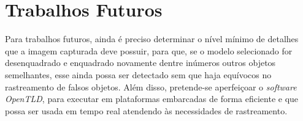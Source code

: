 \chapter[Trabalhos Futuros]{Trabalhos Futuros}
	Para trabalhos futuros, ainda é preciso determinar o nível mínimo de detalhes que a imagem capturada deve possuir, para que, se o modelo selecionado for desenquadrado e enquadrado novamente dentre inúmeros outros objetos semelhantes, esse ainda possa ser detectado sem que haja equívocos no rastreamento de falsos objetos. Além disso, pretende-se aperfeiçoar o \textit{software} \textit{OpenTLD}, para executar em plataformas embarcadas de forma eficiente e que possa ser usada em tempo real atendendo às necessidades de rastreamento.


